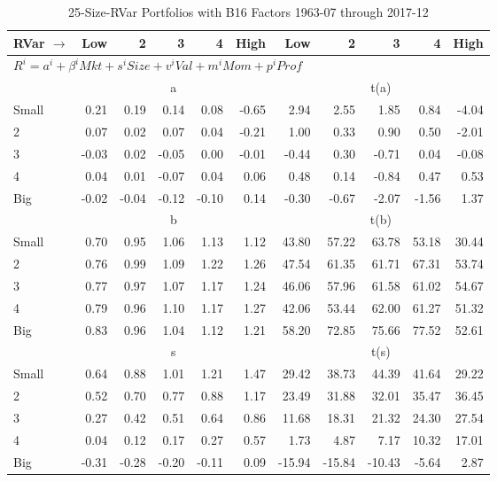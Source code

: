 
\begin{table}[!ht]
\footnotesize
\centering
\caption{25-Size-RVar Portfolios with B16 Factors 1963-07 through 2017-12}
\begin{tabular}{lrrrrrrrrrr}
  \toprule
    
    RVar $\rightarrow$ & Low & 2 & 3 & 4 & High & Low & 2 & 3 & 4 & High  \\ 
  \midrule
  \multicolumn{11}{l}{$R^i=a^i+\beta^iMkt+s^iSize+v^iVal+m^iMom+p^iProf$}  \\
  
     & \multicolumn{5}{c}{a} & \multicolumn{5}{c}{t(a)}   \\
     \cmidrule(r){2-6} \cmidrule(r){7-11} 
    Small  & 0.21  & 0.19  & 0.14  & 0.08  & -0.65  & 2.94  & 2.55  & 1.85  & 0.84  & -4.04   \\
    2  & 0.07  & 0.02  & 0.07  & 0.04  & -0.21  & 1.00  & 0.33  & 0.90  & 0.50  & -2.01   \\
    3  & -0.03  & 0.02  & -0.05  & 0.00  & -0.01  & -0.44  & 0.30  & -0.71  & 0.04  & -0.08   \\
    4  & 0.04  & 0.01  & -0.07  & 0.04  & 0.06  & 0.48  & 0.14  & -0.84  & 0.47  & 0.53   \\
    Big  & -0.02  & -0.04  & -0.12  & -0.10  & 0.14  & -0.30  & -0.67  & -2.07  & -1.56  & 1.37   \\
    
  
     & \multicolumn{5}{c}{b} & \multicolumn{5}{c}{t(b)}   \\
     \cmidrule(r){2-6} \cmidrule(r){7-11} 
    Small  & 0.70  & 0.95  & 1.06  & 1.13  & 1.12  & 43.80  & 57.22  & 63.78  & 53.18  & 30.44   \\
    2  & 0.76  & 0.99  & 1.09  & 1.22  & 1.26  & 47.54  & 61.35  & 61.71  & 67.31  & 53.74   \\
    3  & 0.77  & 0.97  & 1.07  & 1.17  & 1.24  & 46.06  & 57.96  & 61.58  & 61.02  & 54.67   \\
    4  & 0.79  & 0.96  & 1.10  & 1.17  & 1.27  & 42.06  & 53.44  & 62.00  & 61.27  & 51.32   \\
    Big  & 0.83  & 0.96  & 1.04  & 1.12  & 1.21  & 58.20  & 72.85  & 75.66  & 77.52  & 52.61   \\
    
  
     & \multicolumn{5}{c}{s} & \multicolumn{5}{c}{t(s)}   \\
     \cmidrule(r){2-6} \cmidrule(r){7-11} 
    Small  & 0.64  & 0.88  & 1.01  & 1.21  & 1.47  & 29.42  & 38.73  & 44.39  & 41.64  & 29.22   \\
    2  & 0.52  & 0.70  & 0.77  & 0.88  & 1.17  & 23.49  & 31.88  & 32.01  & 35.47  & 36.45   \\
    3  & 0.27  & 0.42  & 0.51  & 0.64  & 0.86  & 11.68  & 18.31  & 21.32  & 24.30  & 27.54   \\
    4  & 0.04  & 0.12  & 0.17  & 0.27  & 0.57  & 1.73  & 4.87  & 7.17  & 10.32  & 17.01   \\
    Big  & -0.31  & -0.28  & -0.20  & -0.11  & 0.09  & -15.94  & -15.84  & -10.43  & -5.64  & 2.87   \\
    

\end{tabular}
\end{table}
